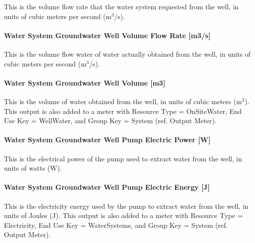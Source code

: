 This is the volume flow rate that the water system requested from the well, in units of cubic meters per second (m\(^{3}\)/s).

\paragraph{Water System Groundwater Well Volume Flow Rate {[}m3/s{]}}\label{water-system-groundwater-well-volume-flow-rate-m3s}

This is the volume flow water of water actually obtained from the well, in units of cubic meters per second (m\(^{3}\)/s).

\paragraph{Water System Groundwater Well Volume {[}m3{]}}\label{water-system-groundwater-well-volume-m3}

This is the volume of water obtained from the well, in units of cubic meters (m\(^{3}\)). This output is also added to a meter with Resource Type = OnSiteWater, End Use Key = WellWater, and Group Key = System (ref. Output Meter).

\paragraph{Water System Groundwater Well Pump Electric Power {[}W{]}}\label{water-system-groundwater-well-pump-electric-power-w}

This is the electrical power of the pump used to extract water from the well, in units of watts (W).

\paragraph{Water System Groundwater Well Pump Electric Energy {[}J{]}}\label{water-system-groundwater-well-pump-electric-energy-j}

This is the electricity energy used by the pump to extract water from the well, in units of Joules (J). This output is also added to a meter with Resource Type = Electricity, End Use Key = WaterSystems, and Group Key = System (ref. Output Meter).
